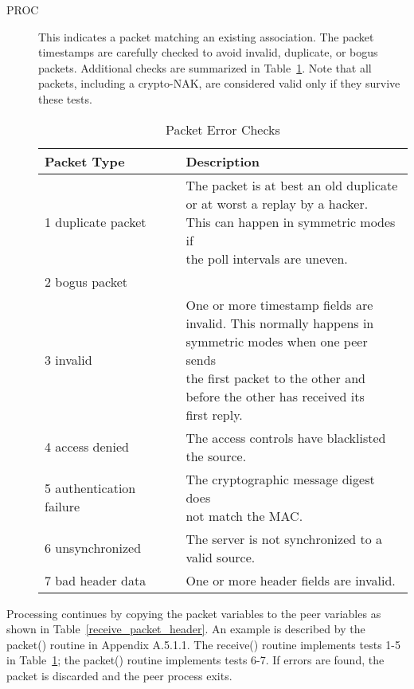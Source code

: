 \begin{description}
  \item[PROC] This indicates a packet matching an existing association. The
    packet timestamps are carefully checked to avoid invalid, duplicate,
    or bogus packets. Additional checks are summarized in Table~\ref{packet_error_checks}.
    Note that all packets, including a crypto-NAK, are considered valid
    only if they survive these tests.

    \begin{table}[htb]
      \center
      \begin{tabular}{| l | l |}
        \hline
        Packet Type & Description \\
        \hline
        \hline
        1 duplicate packet & \makecell[l]{The packet is at best an old duplicate \\ or at worst a replay by a hacker. \\ This can happen in symmetric modes if \\ the poll intervals are uneven.} \\
        2 bogus packet & \\
        3 invalid & \makecell[l]{One or more timestamp fields are \\ invalid. This normally happens in \\ symmetric modes when one peer sends \\ the first packet to the other and \\ before the other has received its \\ first reply.} \\
        4 access denied & \makecell[l]{The access controls have blacklisted \\ the source.} \\
        5 authentication failure & \makecell[l]{The cryptographic message digest does \\ not match the MAC.} \\
        6 unsynchronized & \makecell[l]{The server is not synchronized to a \\ valid source.} \\
        7 bad header data & One or more header fields are invalid. \\
        \hline
      \end{tabular}
      \caption{Packet Error Checks}
      \label{packet_error_checks}
    \end{table}

\end{description}

Processing continues by copying the packet variables to the peer
variables as shown in Table~\ref{receive_packet_header}. An example is described by the
packet() routine in Appendix A.5.1.1. The receive() routine
implements tests 1-5 in Table~\ref{packet_error_checks}; the packet() routine implements
tests 6-7. If errors are found, the packet is discarded and the peer
process exits.

